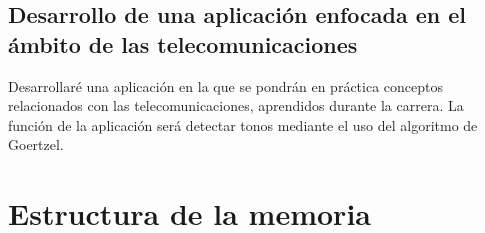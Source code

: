 \subsection{Desarrollo de una aplicación enfocada en el ámbito de las telecomunicaciones}
Desarrollaré una aplicación en la que se pondrán en práctica conceptos relacionados con las telecomunicaciones, aprendidos durante la carrera. La función de la aplicación será detectar tonos mediante el uso del algoritmo de Goertzel.

\section{Estructura de la memoria}